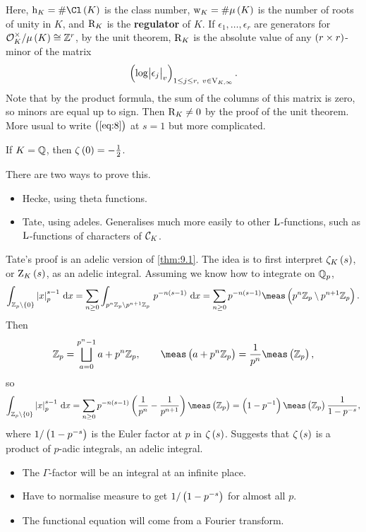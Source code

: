 Here, $ \h_K = \#\Cl\br{K} $ is the class number, $ \w_K = \#\mu\br{K} $ is the number of roots of unity in $ K $, and $ \mathrm{R}_K $ is the \textbf{regulator} of $ K $. If $ \epsilon_1, \dots, \epsilon_r $ are generators for $ \OOO_K^\times / \mu\br{K} \cong \ZZ^r $, by the unit theorem, $ \mathrm{R}_K $ is the absolute value of any $ \br{r \times r} $-minor of the matrix
$$ \br{\log \abs{\epsilon_j}_v}_{1 \le j \le r, \ v \in \V_{K, \infty}}. $$
Note that by the product formula, the sum of the columns of this matrix is zero, so minors are equal up to sign. Then $ \mathrm{R}_K \ne 0 $ by the proof of the unit theorem. More usual to write $ \br{\ref{eq:8}} $ at $ s = 1 $ but more complicated.

\begin{example*}
If $ K = \mathbb{Q} $, then $ \zeta\br{0} = -\tfrac{1}{2} $.
\end{example*}

There are two ways to prove this.
\begin{itemize}
\item Hecke, using theta functions.
\item Tate, using adeles. Generalises much more easily to other $ \mathrm{L} $-functions, such as $ \mathrm{L} $-functions of characters of $ \mathcal{C}_K $.
\end{itemize}

\pagebreak

Tate's proof is an adelic version of \ref{thm:9.1}. The idea is to first interpret $ \zeta_K\br{s} $, or $ \Z_K\br{s} $, as an adelic integral. Assuming we know how to integrate on $ \mathbb{Q}_p $,
$$ \intd{\ZZ_p \setminus \cbr{0}}{}{\abs{x}_p^{s - 1}}{x} = \sum_{n \ge 0} \intd{p^n\ZZ_p \setminus p^{n + 1}\ZZ_p}{}{p^{-n\br{s - 1}}}{x} = \sum_{n \ge 0} p^{-n\br{s - 1}}\meas\br{p^n\ZZ_p \setminus p^{n + 1}\ZZ_p}. $$
Then
$$ \ZZ_p = \bigsqcup_{a = 0}^{p^n - 1} a + p^n\ZZ_p, \qquad \meas\br{a + p^n\ZZ_p} = \dfrac{1}{p^n}\meas\br{\ZZ_p}, $$
so
$$ \intd{\ZZ_p \setminus \cbr{0}}{}{\abs{x}_p^{s - 1}}{x} = \sum_{n \ge 0} p^{-n\br{s - 1}}\br{\dfrac{1}{p^n} - \dfrac{1}{p^{n + 1}}}\meas\br{\ZZ_p} = \br{1 - p^{-1}}\meas\br{\ZZ_p}\dfrac{1}{1 - p^{-s}}, $$
where $ 1 / \br{1 - p^{-s}} $ is the Euler factor at $ p $ in $ \zeta\br{s} $. Suggests that $ \zeta\br{s} $ is a product of $ p $-adic integrals, an adelic integral.
\begin{itemize}
\item The $ \Gamma $-factor will be an integral at an infinite place.
\item Have to normalise measure to get $ 1 / \br{1 - p^{-s}} $ for almost all $ p $.
\item The functional equation will come from a Fourier transform.
\end{itemize}

